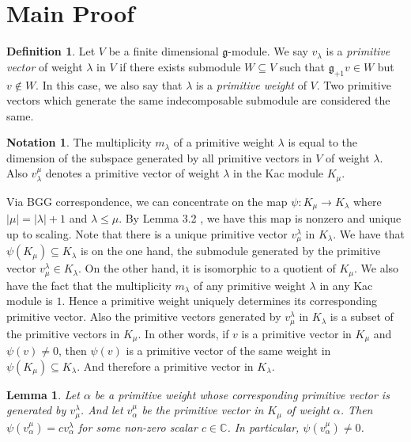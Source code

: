 \documentclass[12pt]{amsart}
\newtheorem{lem}[thm]{Lemma}
\theoremstyle{definition}
\newtheorem{defn}[thm]{Definition}
\newtheorem{notn}[thm]{Notation}
\theoremstyle{remark}
\newcommand{\bbC}{\mathbb{C}}
\newcommand{\fg}{\mathfrak{g}}
\numberwithin{equation}{section}
\begin{document}
\section{Main Proof} \label{section:MainProof}
\begin{defn}
Let $V$ be a finite dimensional $\fg$-module. We say $v_{\lambda}$ is a \emph{primitive vector} of weight $\lambda$ in $V$ if there exists submodule $W \subseteq V$ such that $\fg_{+1} v \in W$ but $v \notin W$. In this case, we also say that $\lambda$ is a \emph{primitive weight} of $V$. Two primitive vectors which generate the same indecomposable submodule are considered the same. 
\end{defn}

\begin{notn}
The multiplicity $m_{\lambda}$ of a primitive weight $\lambda$ is equal to the dimension of the subspace generated by all primitive vectors in $V$ of weight $\lambda$. Also $v_{\lambda}^{\mu}$ denotes a primitive vector of weight $\lambda$ in the Kac module $K_{\mu}$.
\end{notn}

Via BGG correspondence, we can concentrate on the map $\psi \colon K_{\mu} \to K_{\lambda}$ where $|\mu| = |\lambda| + 1$ and $\lambda \leq \mu$. By Lemma 3.2 \cite{RW}, we have this map is nonzero and unique up to scaling. Note that there is a unique primitive vector $v_{\mu}^{\lambda}$ in $K_{\lambda}$. We have that $\psi(K_{\mu}) \subseteq K_{\lambda}$ is on the one hand, the submodule generated by the primitive vector $v_{\mu}^{\lambda} \in K_{\lambda}$. On the other hand, it is isomorphic to a quotient of $K_{\mu}$. We also have the fact that the multiplicity $m_{\lambda}$ of any primitive weight $\lambda$ in any Kac module is $1$. Hence a primitive weight uniquely determines its corresponding primitive vector. Also the primitive vectors generated by $v_{\mu}^{\lambda}$ in $K_{\lambda}$ is a subset of the primitive vectors in $K_{\mu}$. In other words, if $v$ is a primitive vector in $K_{\mu}$ and $\psi(v) \neq 0$, then $\psi(v)$ is a primitive vector of the same weight in $\psi(K_{\mu}) \subseteq K_{\lambda}$. And therefore a primitive vector in $K_{\lambda}$. 

\begin{lem} \label{lemma:image1}
Let $\alpha$ be a primitive weight whose corresponding primitive vector is generated by $v_{\mu}^{\lambda}$. And let $v_{\alpha}^{\mu}$ be the primitive vector in $K_{\mu}$ of weight $\alpha$. Then $\psi(v_{\alpha}^{\mu}) = c v_{\alpha}^{\lambda}$ for some non-zero scalar $c \in \bbC$. In particular, $\psi(v_{\alpha}^{\mu}) \neq 0$.
\end{lem}
\end{document}

